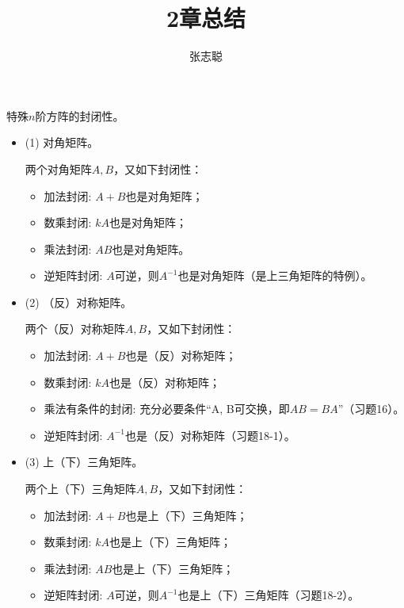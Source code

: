 \documentclass{article}
\begin{document}
\title{2章总结}
\author{张志聪}
\maketitle

\begin{zremark}
  特殊$n$阶方阵的封闭性。
\end{zremark}

\begin{itemize}
  \item (1) 对角矩阵。

        两个对角矩阵$A, B$，又如下封闭性：
        \begin{itemize}
          \item 加法封闭: $A + B$也是对角矩阵；
          \item 数乘封闭: $kA$也是对角矩阵；
          \item 乘法封闭: $AB$也是对角矩阵。
          \item 逆矩阵封闭: $A$可逆，则$A^{-1}$也是对角矩阵（是上三角矩阵的特例）。
        \end{itemize}


  \item (2) （反）对称矩阵。

        两个（反）对称矩阵$A, B$，又如下封闭性：
        \begin{itemize}
          \item 加法封闭: $A + B$也是（反）对称矩阵；
          \item 数乘封闭: $kA$也是（反）对称矩阵；
          \item 乘法有条件的封闭: 充分必要条件“A, B可交换，即$AB = BA$”（习题16）。
          \item 逆矩阵封闭: $A^{-1}$也是（反）对称矩阵（习题18-1）。
        \end{itemize}

  \item (3) 上（下）三角矩阵。

        两个上（下）三角矩阵$A, B$，又如下封闭性：
        \begin{itemize}
          \item 加法封闭: $A + B$也是上（下）三角矩阵；
          \item 数乘封闭: $kA$也是上（下）三角矩阵；
          \item 乘法封闭: $AB$也是上（下）三角矩阵；
          \item 逆矩阵封闭: $A$可逆，则$A^{-1}$也是上（下）三角矩阵（习题18-2）。
        \end{itemize}
\end{itemize}
\end{document}
